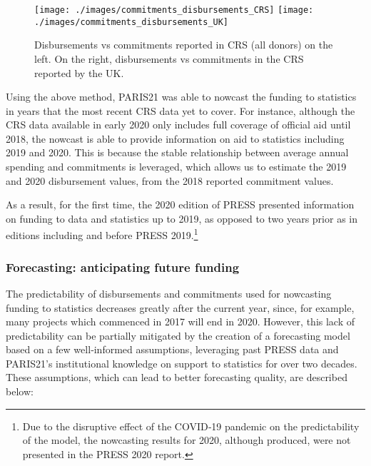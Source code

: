 \documentclass[
]{article}
\begin{document}
\begin{figure}

{\centering \texttt{[image: ./images/commitments\_disbursements\_CRS]} \texttt{[image: ./images/commitments\_disbursements\_UK]} 

}

\caption{Disbursements vs commitments reported in CRS (all donors) on the left. On the right, disbursements vs commitments in the CRS reported by the UK.}\label{fig:commitments-CRS}
\end{figure}

Using the above method, PARIS21 was able to nowcast the funding to statistics in years that the most
recent CRS data yet to cover. For instance, although the CRS data available in early 2020 only includes
full coverage of official aid until 2018, the nowcast is able to provide information on aid to statistics
including 2019 and 2020. This is because the stable relationship between average annual spending
and commitments is leveraged, which allows us to estimate the 2019 and 2020 disbursement values,
from the 2018 reported commitment values.

As a result, for the first time, the 2020 edition of PRESS presented information on funding to data and
statistics up to 2019, as opposed to two years prior as in editions including and before PRESS 2019.\footnote{Due to the disruptive effect of the COVID‐19 pandemic on the predictability of the model, the nowcasting results for 2020, although produced, were not presented in the PRESS 2020 report.}

\hypertarget{forecasting-anticipating-future-funding}{%
\subsubsection{Forecasting: anticipating future funding}\label{forecasting-anticipating-future-funding}}

The predictability of disbursements and commitments used for nowcasting funding to statistics
decreases greatly after the current year, since, for example, many projects which commenced in 2017
will end in 2020. However, this lack of predictability can be partially mitigated by the creation of a
forecasting model based on a few well‐informed assumptions, leveraging past PRESS data and
PARIS21's institutional knowledge on support to statistics for over two decades. These assumptions,
which can lead to better forecasting quality, are described below:
\end{document}
